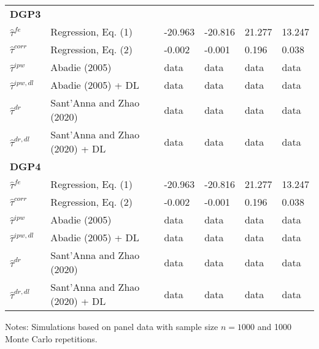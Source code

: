 \begin{table}[htbp]
{\begin{threeparttable}
\begin{tabular}{llllll}
\addlinespace
\large \textbf{DGP3}            &                                   &            &             &      &           \\
\addlinespace
$\hat{\tau}^{fe}$ & Regression, Eq. (1)               & -20.963       & -20.816        & 21.277 & 13.247      \\
$\hat{\tau}^{corr}$ & Regression, Eq. (2)             & -0.002       & -0.001        & 0.196 & 0.038      \\
$\hat{\tau}^{ipw}$ & Abadie (2005)                    & data       & data        & data & data      \\
$\hat{\tau}^{ipw,dl}$ & Abadie (2005) + DL            & data       & data        & data & data      \\
$\hat{\tau}^{dr}$ & Sant'Anna and Zhao (2020)         & data       & data        & data & data      \\
$\hat{\tau}^{dr,dl}$ & Sant'Anna and Zhao (2020) + DL & data       & data        & data & data      \\  \midrule


\addlinespace
\large \textbf{DGP4}            &                                   &            &             &      &           \\
\addlinespace
$\hat{\tau}^{fe}$ & Regression, Eq. (1)               & -20.963       & -20.816        & 21.277 & 13.247      \\
$\hat{\tau}^{corr}$ & Regression, Eq. (2)             & -0.002       & -0.001        & 0.196 & 0.038      \\
$\hat{\tau}^{ipw}$ & Abadie (2005)                    & data       & data        & data & data      \\
$\hat{\tau}^{ipw,dl}$ & Abadie (2005) + DL            & data       & data        & data & data      \\
$\hat{\tau}^{dr}$ & Sant'Anna and Zhao (2020)         & data       & data        & data & data      \\
$\hat{\tau}^{dr,dl}$ & Sant'Anna and Zhao (2020) + DL & data       & data        & data & data      \\


\bottomrule
\end{tabular}
\vspace{1em}
\begin{tablenotes}
\item Notes: Simulations based on panel data with sample size $n = 1000$ and 1000 Monte Carlo repetitions.
\end{tablenotes}
\end{threeparttable}}
\end{table}
